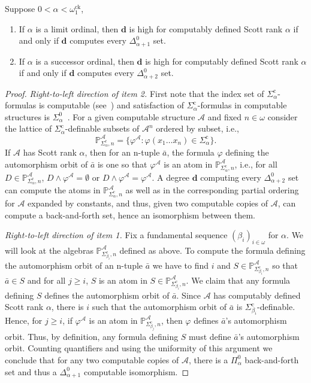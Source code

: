 \documentclass{amsart}
\newcommand\+[1]{\mathcal{#1}}
\renewcommand\*[1]{\mathbf{#1}}
\renewcommand\=[1]{\text{#1}}
\renewcommand\*[1]{\mathbf{#1}}
\renewcommand{\phi}{\varphi}
\newcommand{\A}{\mathcal{A}}
\newcommand{\Sicom}[1]{\Sigma^{\mathrm{c}}_{#1}}
\newcommand{\ock}{\omega_{1}^{\mathrm{ck}}}
\newcommand{\nat}{\omega}
\begin{document}
 \begin{theorem}\label{thm:highforcompSR}
    Suppose $0 < \alpha < \ock$,
\begin{enumerate}
\item If $\alpha$ is a limit ordinal, then $\*d$ is high for computably defined Scott rank $\alpha$ if and only if $\*d$ computes every $\Delta^0_{\alpha+1}$ set.
\item If $\alpha$ is a successor ordinal, then $\*d$ is high for computably defined Scott rank $\alpha$ if and only if $\*d$ computes every $\Delta^0_{\alpha+2}$ set.
\end{enumerate}
\end{theorem}
\begin{proof}
  \emph{Right-to-left direction of item 2.} First note that the index set of $\Sicom{\alpha}$-formulas is computable (see~\cite[p.~106]{ash2000}) and satisfaction of $\Sicom{\alpha}$-formulas in computable structures is $\Sigma^0_\alpha$~\cite[Theorem 7.5]{ash2000}. For a given computable structure $\+A$ and fixed $n\in\nat$ consider the lattice of $\Sicom{\alpha}$-definable subsets of $\A^n$ ordered by subset, i.e.,
  \[ \mathbb{P}_{\Sicom{\alpha},n}^{{\+A}}=\{ \phi^\+A: \phi(x_1\dots x_n)\in \Sicom{\alpha}\}.\]
  If $\+A$ has Scott rank $\alpha$, then for an n-tuple $\bar a$, the formula $\phi$ defining the automorphism orbit of $\bar a$ is one so that $\phi^{\+A}$ is an atom in $\mathbb{P}_{\Sicom\alpha,n}^{\+A}$, i.e., for all $D\in \mathbb{P}_{\Sicom\alpha,n}^{\+A}$, $D\land \phi^{\+A}=\emptyset$ or $D\land \phi^{\+A}=\phi^{\+A}$. A degree $\*d$ computing every $\Delta^0_{\alpha+2}$ set can compute the atoms in $\mathbb{P}_{\Sicom\alpha,n}^{\+A}$ as well as in the corresponding partial ordering for $\+A$ expanded by constants, and thus, given two computable copies of $\+A$, can compute a back-and-forth set, hence an isomorphism between them.

  \emph{Right-to-left direction of item 1.} Fix a fundamental sequence $(\beta_i)_{i\in\nat}$ for $\alpha$. We will look at the algebras $\mathbb P_{\Sicom{\beta_i},n}^{{\+A}}$ defined as above. To compute the formula defining the automorphism orbit of an n-tuple $\bar a$ we have to find $i$ and $S\in\mathbb P_{\Sicom{\beta_i},n}^{{\+A}}$ so that $\bar a\in S$ and for all $j\geq i$, $S$ is an atom in $S\in\mathbb P_{\Sicom{\beta_i},n}^{{\+A}}$. We claim that any formula defining $S$ defines the automorphism orbit of $\bar a$. Since $\+A$ has computably defined Scott rank $\alpha$, there is $i$ such that the automorphism orbit of $\bar a$ is $\Sicom{\beta_i}$-definable. Hence, for $j\geq i$, if $\phi^{\+A}$ is an atom in $\mathbb P_{\Sicom{\beta_j},n}^{{\+A}}$, then $\phi$ defines $\bar a$'s automorphism orbit. Thus, by definition, any formula defining $S$ must define $\bar a$'s automorphism orbit. Counting quantifiers and using the uniformity of this argument we conclude that for any two computable copies of $\+A$, there is a $\Pi^0_\alpha$ back-and-forth set and thus a $\Delta^0_{\alpha+1}$ computable isomorphism.


\end{proof}
\end{document}

